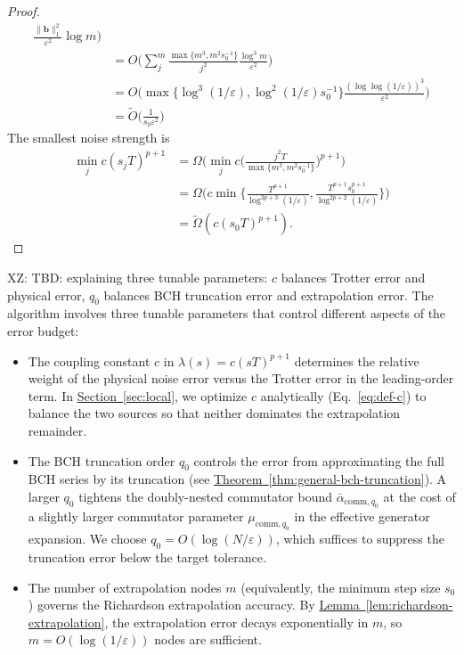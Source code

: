 \documentclass[aps,pra,reprint,groupedaddress,floatfix]{revtex4-2}
\newcommand{\thm}[1]{\hyperref[thm:#1]{Theorem~\ref*{thm:#1}}}
\newcommand{\lem}[1]{\hyperref[lem:#1]{Lemma~\ref*{lem:#1}}}
\renewcommand{\sec}[1]{\hyperref[sec:#1]{Section~\ref*{sec:#1}}}
\newcommand{\eps}{\varepsilon}
\newcommand{\xz}[1]{{\color{cyan} XZ: #1}}
\begin{document}
\begin{proof}
\begin{align*}
        \frac{\|\mathbf{b}\|_1^2}{\eps^2}\log m\Big)\\
        &=
        O\Bigg(
        \sum_j^{m}
        \frac{\max\{m^3, m^2s_0^{-1}\}}{j^2}
        \frac{\log^3 m}{\eps^2}
        \Bigg)\\
        &=
        O\Bigg(
        \max\{\log^3(1/\eps), \log^2(1/\eps)s_0^{-1}\}
        \frac{(\log\log (1/\eps))^3}{\eps^2}
        \Bigg) \\
        &= \widetilde{O}\Big(\frac{1}{s_0\eps^2}\Big)
    \end{align*}
    The smallest noise strength is
    \begin{align*}
        \min_{j}c(s_jT)^{p+1} &= \Omega\Big(\min_{j}c\Big(\frac{j^2T}{\max\{m^3, m^2s_0^{-1}\}}\Big)^{p+1}\Big) \\
        &=\Omega\Big(c\min\Big\{\frac{T^{p+1}}{\log^{3p+3}(1/\eps)}, \frac{ T^{p+1}s_0^{p+1}}{\log^{2p+2}(1/\eps)}\Big\}\Big)\\
        & = \widetilde{\Omega}(c (s_0 T)^{p+1}).
    \end{align*}
\end{proof}
\xz{TBD: explaining three tunable parameters: $c$ balances Trotter error and physical error, $q_0$ balances BCH truncation error and extrapolation error.}
The algorithm involves three tunable parameters that control different aspects of the error budget:
\begin{itemize}
    \item The coupling constant $c$ in $\lambda(s)=c(sT)^{p+1}$ determines the relative weight of the physical noise error versus the Trotter error in the leading-order term. In \sec{local}, we optimize $c$ analytically (Eq.~\eqref{eq:def-c}) to balance the two sources so that neither dominates the extrapolation remainder.
    \item The BCH truncation order $q_0$ controls the error from approximating the full BCH series by its truncation (see \thm{general-bch-truncation}). A larger $q_0$ tightens the doubly-nested commutator bound $\bar{\alpha}_{\mathrm{comm},q_0}$ at the cost of a slightly larger commutator parameter $\mu_{\mathrm{comm},q_0}$ in the effective generator expansion. We choose $q_0 = O(\log(N/\eps))$, which suffices to suppress the truncation error below the target tolerance.
    \item The number of extrapolation nodes $m$ (equivalently, the minimum step size $s_0$) governs the Richardson extrapolation accuracy. By \lem{richardson-extrapolation}, the extrapolation error decays exponentially in $m$, so $m = O(\log(1/\eps))$ nodes are sufficient.
\end{itemize}
\end{document}
